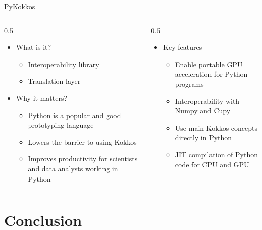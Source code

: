 \documentclass[
    aspectratio=169,
    \createHandout
]{beamer}
\begin{document}
\begin{frame}{PyKokkos}
    \begin{columns}
        \begin{column}{0.5\linewidth}
            \begin{itemize}
                \item What is it?
                \begin{itemize}
                    \item Interoperability library
                    \item Translation layer
                \end{itemize}
                \item Why it matters?
                \begin{itemize}
                    \item Python is a popular and good prototyping language
                    \item Lowers the barrier to using Kokkos
                    \item Improves productivity for scientists and data analysts working in Python
                \end{itemize}
            \end{itemize}
        \end{column}
        \begin{column}{0.5\linewidth}
            \begin{itemize}
                \item Key features
                \begin{itemize}
                    \item Enable portable GPU acceleration for Python programs
                    \item Interoperability with Numpy and Cupy
                    \item Use main Kokkos concepts directly in Python
                    \item JIT compilation of Python code for CPU and GPU
                \end{itemize}
            \end{itemize}
        \end{column}
    \end{columns}
\end{frame}

\section{Conclusion}
\end{document}
